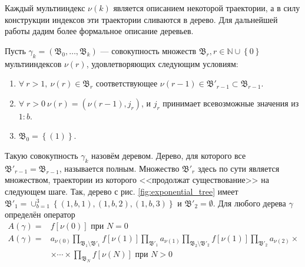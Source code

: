Каждый мультииндекс $\nu(k)$ является описанием некоторой траектории, а в силу конструкции индексов эти траектории сливаются в дерево. Для дальнейшей работы дадим более формальное описание деревьев.

Пусть $\gamma_k = \left(\mathfrak{B}_0,\ldots,\mathfrak{B}_k\right)$ --- совокупность множеств $\mathfrak{B}_r, r\in \mathbb{N}\cup\left\lbrace 0\right\rbrace$ мультииндексов $\nu(r)$, удовлетворяющих следующим условиям:
\begin{enumerate}
	\item $\forall\: r > 1, \:\nu(r)\in \mathfrak{B}_r$ соответствующее $\nu(r-1)\in\mathfrak{B}'_{r-1}\subset\mathfrak{B}_{r-1}$.
	\item $\forall\; r > 0 \:\nu(r) = \left(\nu(r-1), j_r\right)$, и $j_r$ принимает всевозможные значения из $1:b$.
	\item $\mathfrak{B}_0 = \left\lbrace\left(1\right)\right\rbrace$.
\end{enumerate}
Такую совокупность $\gamma_k$ назовём деревом. Дерево, для которого все $\mathfrak{B}'_{r-1} = \mathfrak{B}_{r-1}$, называется полным. Множество $\mathfrak{B}'_{r}$ здесь по сути является множеством, траектории из которого <<продолжат существование>> на следующем шаге. Так, дерево с рис. \ref{fig:exponential_tree} имеет $\mathfrak{B}'_1 = \cup_{b=1}^3 \left\lbrace (1, b,1), (1,b,2), (1,b,3)\right\rbrace$ и $\mathfrak{B}'_2 = \emptyset$. Для любого дерева $\gamma$ определён оператор
\begin{equation}\label{eq:tree-operator}
	\begin{aligned}
	A\left(\gamma\right) = &f\left[\nu(0)\right] \text{ при } N=0 \\
	A\left(\gamma\right) = &a_{\nu(0)}\prod_{\mathfrak{B}_1\setminus\mathfrak{B}'_1}f\left[\nu(1)\right]\prod_{\mathfrak{B}'_1}a_{\nu(1)} \prod_{\mathfrak{B}_2\setminus\mathfrak{B}'_2}f\left[\nu(1)\right]\prod_{\mathfrak{B}'_2}a_{\nu(2)} \times \\
	&\times\cdots\times \prod_{\mathfrak{B}_N}f\left[\nu(N)\right] \text{ при } N>0
	\end{aligned} 
\end{equation}

		
